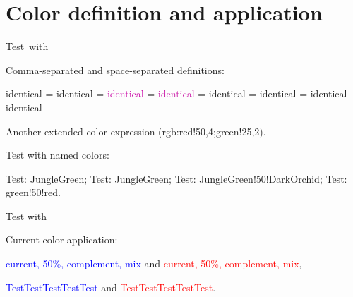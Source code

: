 \documentclass[a4paper]{article}
\begin{document}
\section{Color definition and application}

\hbox{\textcolor{dummy}{Test with \texttt{\string\definecolor}}}

\bigskip

Comma-separated and space-separated definitions:


\textcolor{c1}{identical} =
\textcolor{c2}{identical} =
\textcolor{c1a}{identical} =
\textcolor{c2a}{identical} =
\textcolor[rgb]{.7,.6,.5}{identical} =
\textcolor[rgb]{.7 .6 .5}{identical} =
\textcolor{rgb,10:red,7;green,6;blue,5}{identical}
\textcolor{rgb,15:red,10.5;green,9;blue,7.5}{identical}

\medskip

\begingroup
\sffamily
\begin{testcolors}
\end{testcolors}
\endgroup

\bigskip

\textcolor{rgb:red!50,4;green!25,2}{Another extended color expression (rgb:red!50,4;green!25,2)}.

\bigskip

\begingroup
\color{black}
Test with named colors:\par
\color{blue}
Test: \textcolor[named]{JungleGreen}{JungleGreen};
Test: \textcolor{JungleGreen}{JungleGreen};
Test: \textcolor{JungleGreen!50!DarkOrchid}{JungleGreen!50!DarkOrchid};
Test: \textcolor{green!50!red}{green!50!red}.
\endgroup

\bigskip

{\color[rgb]{.4,.5,.6}Test with \texttt{\string\color}}

\bigskip
Current color application:\par
\def\test{current, \textcolor{.!50}{50\%}, \textcolor{-.}{complement},
          \textcolor{yellow!50!.}{mix}}
\textcolor{blue}{\test} and \textcolor{red}{\test},\par
\def\Test{\color{.!80}Test}
\textcolor{blue}{\Test\Test\Test\Test\Test} and
\textcolor{red}{\Test\Test\Test\Test\Test}.
\end{document}
